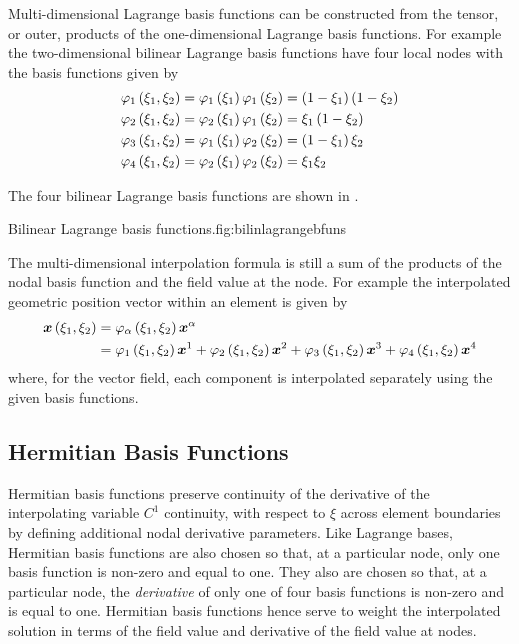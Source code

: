 Multi-dimensional Lagrange basis functions can be constructed from the tensor,
or outer, products of the one-dimensional Lagrange basis functions. For
example the two-dimensional bilinear Lagrange basis functions have four local
nodes with the basis functions given by
\begin{equation}
  \begin{split}
       \varphi_{1} \left( \xi_{1},\xi_{2} \right)  &=   \varphi_{1} \left( \xi_{1} \right)     \varphi_{1} \left( \xi_{2} \right)  =
    \left( 1-\xi_{1} \right)\left( 1-\xi_{2} \right)\\
       \varphi_{2} \left( \xi_{1},\xi_{2} \right)  &=   \varphi_{2} \left( \xi_{1} \right)     \varphi_{1} \left( \xi_{2} \right)  =
    \xi_{1}\left( 1-\xi_{2} \right)\\
       \varphi_{3} \left( \xi_{1},\xi_{2} \right)  &=   \varphi_{1} \left( \xi_{1} \right)     \varphi_{2} \left( \xi_{2} \right)  =
    \left( 1-\xi_{1} \right)\xi_{2} \\
       \varphi_{4} \left( \xi_{1},\xi_{2} \right)  &=   \varphi_{2} \left( \xi_{1} \right)     \varphi_{2} \left( \xi_{2} \right)  =
    \xi_{1}\xi_{2}
  \end{split}
\end{equation}

The four \twodal bilinear Lagrange basis functions are shown in .

            {Bilinear Lagrange basis functions.}{fig:bilinlagrangebfuns}
            
The multi-dimensional interpolation formula is still a sum of the products of
the nodal basis function and the field value at the node. For example the
interpolated geometric position vector within an element is given by
\begin{equation}
  \begin{split}
    \fnof{\vect{x}}{\xione,\xitwo}&=\lbfn{\alpha}{\xione,\xitwo}
    \nodept{\vect{x}}{\alpha}\\
    &=\lbfn{1}{\xione,\xitwo}\nodept{\vect{x}}{1}+\lbfn{2}{\xione,\xitwo}
    \nodept{\vect{x}}{2}+\lbfn{3}{\xione,\xitwo}\nodept{\vect{x}}{3}+
    \lbfn{4}{\xione,\xitwo}\nodept{\vect{x}}{4}
  \end{split}
\end{equation}
where, for the vector field, each component is interpolated separately using
the given basis functions.

\subsection{Hermitian Basis Functions}
\label{sec:Hermitianbasisfunctions}

Hermitian basis functions preserve continuity of the derivative of the
interpolating variable \ie $C^{1}$ continuity, with respect to $\xi$ across
element boundaries by defining additional nodal derivative parameters. Like
Lagrange bases, Hermitian basis functions are also chosen so that, at a
particular node, only one basis function is non-zero and equal to one. They
also are chosen so that, at a particular node, the \emph{derivative} of only
one of four basis functions is non-zero and is equal to one. Hermitian basis
functions hence serve to weight the interpolated solution in terms of the
field value and derivative of the field value at nodes.

